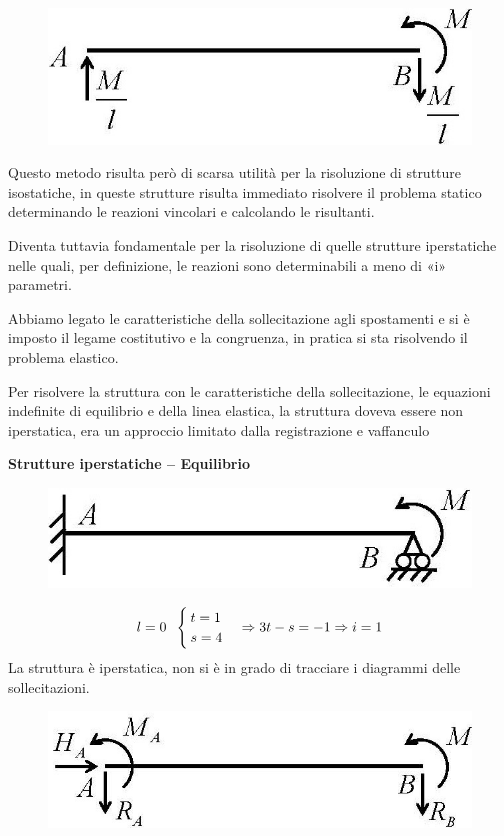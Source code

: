\documentclass{article}
\begin{document}
\begin{adjustwidth}{2in}{}
\begin{figure}[H]
	\centering
	\includegraphics[width=0.4\linewidth]{"immagini/1.PARTE8_Pagina_37"}
\end{figure}

		Questo metodo risulta però di scarsa utilità per la risoluzione di strutture isostatiche, in queste strutture risulta immediato risolvere il problema statico determinando le reazioni vincolari e calcolando le risultanti.
		
		Diventa tuttavia fondamentale per la risoluzione di quelle strutture iperstatiche nelle quali, per definizione, le reazioni sono
		determinabili a meno di «i» parametri. \newline 
		
		
		Abbiamo legato le caratteristiche della sollecitazione agli spostamenti e si è imposto il legame costitutivo e la congruenza, in pratica si sta risolvendo il problema elastico. 
		
		Per risolvere la struttura con le caratteristiche della sollecitazione, le equazioni indefinite di equilibrio e della linea elastica, la struttura doveva essere non iperstatica, era un approccio limitato dalla registrazione e vaffanculo
		
		
\newpage		
{\Large \textbf{Strutture iperstatiche – Equilibrio}} \mbox{} \newline

\begin{figure}[H]
	\centering
	\includegraphics[width=0.4\linewidth]{"immagini/1.PARTE8_Pagina_38 (2)"}
\end{figure}

		\[ l = 0 \hspace{0.2cm} \begin{cases}
		t = 1 \\
		s = 4
		\end{cases} \Rightarrow 3t - s = -1 \Rightarrow i =1\]	
		La struttura è iperstatica, non si è in grado di tracciare i diagrammi delle sollecitazioni.
		
\begin{figure}[H]
	\centering
	\includegraphics[width=0.4\linewidth]{"immagini/1.PARTE8_Pagina_38"}
\end{figure}


\end{adjustwidth}
\end{document}
